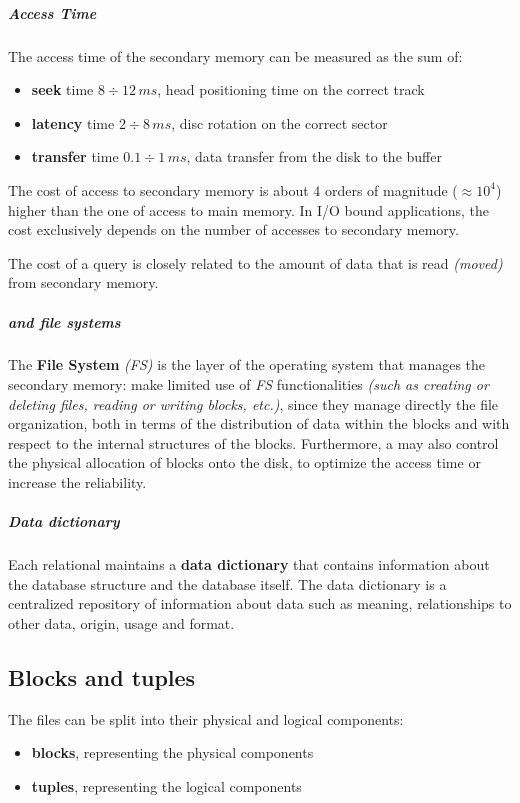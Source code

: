 \documentclass[english]{article}
\begin{document}
\subparagraph*{Access Time}
The access time of the secondary memory can be measured as the sum of:
\begin{itemize}
  \item \textbf{seek} time \(8 \div 12 \, ms\), head positioning time on the correct track
  \item \textbf{latency} time \(2 \div 8 \, ms\), disc rotation on the correct sector
  \item \textbf{transfer} time \(0.1 \div 1 \, ms\), data transfer from the disk to the buffer
\end{itemize}

The cost of access to secondary memory is about \(4\) orders of magnitude (\(\approx 10^4\)) higher than the one of access to main memory.
In I/O bound applications, the cost exclusively depends on the number of accesses to secondary memory.

The cost of a query is closely related to the amount of data that is read \textit{(moved)} from secondary memory.

\subparagraph*{\dbms and file systems}
The \textbf{File System} \textit{(FS)} is the layer of the operating system that manages the secondary memory:
\dbms make limited use of \textit{FS} functionalities \textit{(such as creating or deleting files, reading or writing blocks, etc.)}, since they manage directly the file organization, both in terms of the distribution of data within the blocks and with respect to the internal structures of the blocks.
Furthermore, a \dbms may also control the physical allocation of blocks onto the disk, to optimize the access time or increase the reliability.

\subparagraph*{Data dictionary}

Each relational \dbms maintains a \textbf{data dictionary} that contains information about the database structure and the database itself.
The data dictionary is a centralized repository of information about data such as meaning, relationships to other data, origin, usage and format.

\subsection{Blocks and tuples}

The files can be split into their physical and logical components:

\begin{itemize}
  \item \textbf{blocks}, representing the physical components
  \item \textbf{tuples}, representing the logical components
\end{itemize}
\end{document}

